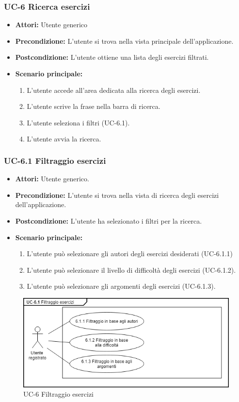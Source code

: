 	\subsubsection{UC-6 Ricerca esercizi}
		\begin{itemize}
			\item\textbf{ Attori:} Utente generico
			\item \textbf{Precondizione:} L'utente si trova nella vista principale dell'applicazione.
			\item \textbf{Postcondizione:} L'utente ottiene una lista degli esercizi filtrati.
			\item \textbf{Scenario principale:}
				\begin{enumerate}
					\item L'utente accede all'area dedicata alla ricerca degli esercizi.
					\item L'utente scrive la frase nella barra di ricerca.
					\item L'utente seleziona i filtri (UC-6.1).
					\item L'utente avvia la ricerca.
				\end{enumerate}
		\end{itemize}

	\subsubsection{UC-6.1 Filtraggio esercizi }
		\begin{itemize}
			\item \textbf{Attori:} Utente generico.
			\item \textbf{Precondizione:} L'utente si trova nella vista di ricerca degli esercizi dell'applicazione.
			\item \textbf{Postcondizione:} L'utente ha selezionato i filtri per la ricerca.
			\item \textbf{Scenario principale:}
				\begin{enumerate}
					\item L'utente può selezionare gli autori degli esercizi desiderati (UC-6.1.1)
					\item L'utente può selezionare il livello di difficoltà degli esercizi (UC-6.1.2).
					\item L'utente può selezionare gli argomenti degli esercizi (UC-6.1.3).
				\end{enumerate}
		\end{itemize}
		\begin{figure}[h]
			\centering
			\includegraphics[scale=0.7]{images/UC-6.png}
			\caption{UC-6 Filtraggio esercizi}
		\end{figure}	

